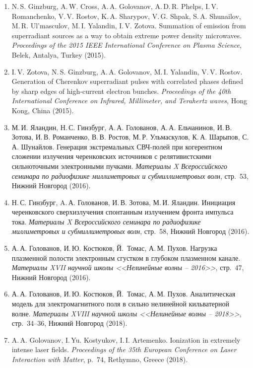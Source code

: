 \documentclass[12pt,a4paper]{scrartcl}
\begin{document}
\begin{enumerate}[parsep=0em, itemsep=0.3em]
\item{N.\,S. Ginzburg, A.\,W. Cross, A.\,A. Golovanov, A.\,D.\,R. Phelps, I.\,V. Romanchenko, V.\,V. Rostov, K.\,A. Sharypov, V.\,G. Shpak, S.\,A. Shunailov, M.\,R. Ul'masculov, M.\,I. Yalandin, I.\,V. Zotova. Summation of emission from superradiant sources as a way to obtain extreme power density microwaves. \textit{Proceedings of the 2015 IEEE International Conference on Plasma Science}, Belek, Antalya, Turkey (2015).}
\item{I.\,V. Zotova, N.\,S. Ginzburg, A.\,A. Golovanov, M.\,I. Yalandin, V.\,V. Rostov. Generation of Cherenkov superradiant pulses with correlated phases defined by sharp edges of high-current electron bunches. \textit{Proceedings of the 40th International Conference on Infrared, Millimeter, and Terahertz waves}, Hong Kong, China (2015).}
\item{ М.\,И. Яландин, Н.\,С. Гинзбург, А.\,А. Голованов, А.\,А. Ельчанинов, И.\,В. Зотова, И.\,В. Романченко, В.\,В. Ростов, М.\,Р. Ульмаскулов, К.\,А. Шарыпов, С.\,А. Шунайлов. Генерация экстремальных СВЧ-полей при когерентном сложении излучения черенковских источников с релятивистскими сильноточными электронными пучками. \textit{Материалы X Всероссийского семинара по радиофизике миллиметровых и субмиллиметровых волн}, стр.~53, Нижний Новгород (2016).}
\item{ Н.\,С. Гинзбург, A.\,А. Голованов, И.\,В. Зотова, М.\,И. Яландин. Инициация черенковского сверхизлучения спонтанным излучением фронта импульса тока. \textit{Материалы X Всероссийского семинара по радиофизике миллиметровых и субмиллиметровых волн}, стр.~58, Нижний Новгород (2016).}
\item{ А.\,А. Голованов, И.\,Ю. Костюков, Й.~Томас, А.\,М. Пухов. Нагрузка плазменной полости электронным сгустком в глубоком плазменном канале. \textit{Материалы XVII научной школы <<Нелинейные волны – 2016>>}, стр.~47, Нижний Новгород (2016).}
\item{ А.\,А. Голованов, И.\,Ю. Костюков, Й.~Томас, А.\,М. Пухов. Аналитическая модель для электромагнитного поля в сильно нелинейной кильватерной волне. \textit{Материалы XVIII научной школы <<Нелинейные волны – 2018>>}, стр.~34--36, Нижний Новгород (2018).}
\item{A.\,A. Golovanov, I.\,Yu. Kostyukov, I.\,I. Artemenko. Ionization in extremely intense laser fields. \textit{Proceedings of the 35th European Conference on Laser Interaction with Matter}, p.~74, Rethymno, Greece (2018).}

\end{enumerate}
\end{document}
